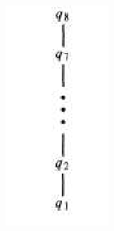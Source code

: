 \documentclass[10pt,]{book}
\theoremstyle{plain}
\theoremstyle{definition}
\theoremstyle{definition}
\theoremstyle{definition}
\theoremstyle{definition}
\begin{document}
\begin{exercisegroup}
\begin{enumerate}[label=\alph*]
\begin{figure}
\includegraphics[width=1\linewidth]{images/fig-sol-6-3-11.png}
\end{figure}
%
\end{enumerate}
%
\end{exercisegroup}
\end{document}
